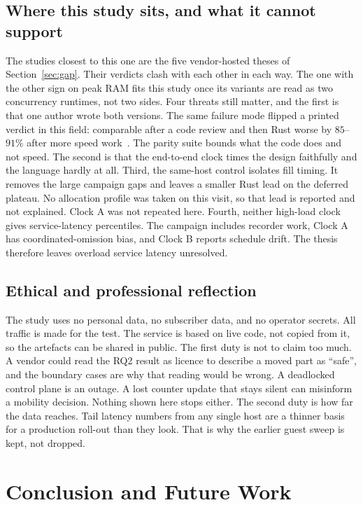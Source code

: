 \documentclass[english,oneside,a4paper,censored,csm,software-track-2020]{HYthesisML}
\begin{document}
\section[Where this study sits]{Where this study sits, and what it cannot support}\label{sec:standing}
The studies closest to this one are the five vendor-hosted theses of
Section~\ref{sec:gap}. Their verdicts clash with each other in each way.
The one with the other sign on peak RAM fits this study
once its variants are read as two concurrency runtimes, not two sides.
Four threats still matter, and the first is that one author wrote both
versions. The same failure mode flipped a printed verdict in this
field: comparable after a code review and then Rust worse by $85$--$91\%$
after more speed work~\cite{emberg2023asn1}. The parity suite bounds
what the code does and not speed. The second is that the end-to-end clock
times the design faithfully and the language hardly at all. Third, the
same-host control isolates fill timing. It removes the large campaign gaps
and leaves a smaller Rust lead on the deferred plateau. No allocation profile
was taken on this visit, so that lead is reported and not explained. Clock A
was not repeated here. Fourth, neither high-load clock gives
service-latency percentiles. The campaign includes recorder work, Clock A has
coordinated-omission bias, and Clock B reports schedule drift. The thesis
therefore leaves overload service latency unresolved.

\section{Ethical and professional reflection}
The study uses no personal data, no subscriber data, and no operator secrets. All
traffic is made for the test. The service is based on live code, not
copied from it, so the artefacts can be shared in public. The first
duty is not to claim too much. A vendor could read the RQ2 result as
licence to describe a moved part as ``safe'', and the boundary cases are
why that reading would be wrong. A deadlocked control plane is an outage. A
lost counter update that stays silent can misinform a mobility decision. Nothing
shown here stops either. The second duty is how far the data reaches.
Tail latency numbers from any single host are a thinner
basis for a production roll-out than they look. That is why the earlier
guest sweep is kept, not dropped.

\chapter{Conclusion and Future Work\label{chapter:conclusions}}
\end{document}
